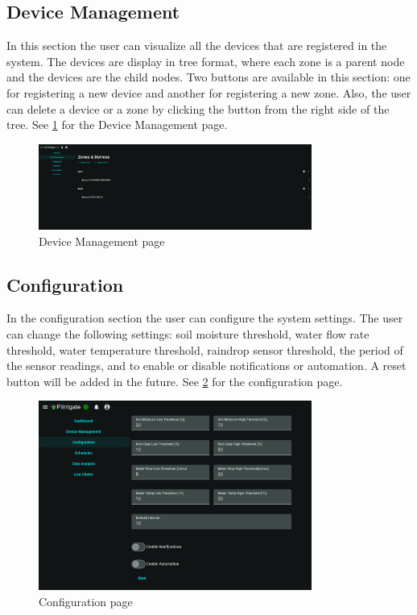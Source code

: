 \subsection{Device Management}
In this section the user can visualize all the devices that are registered in the system.
The devices are display in tree format, where each zone is a parent node and the devices are the child nodes.
Two buttons are available in this section: one for registering a new device and another for registering a new zone.
Also, the user can delete a device or a zone by clicking the button from the right side of the tree. See \ref{fig:device-management} 
for the Device Management page.
\begin{figure}[H]
    \centering
    \includegraphics[width=0.8\textwidth]{images/device_management.png}
    \caption{Device Management page}
    \label{fig:device-management}
\end{figure}

\subsection {Configuration}
In the configuration section the user can configure the system settings. The user can change the following settings:
soil moisture threshold, water flow rate threshold, water temperature threshold, raindrop sensor threshold, the 
period of the sensor readings, and to enable or disable notifications or automation. A reset button will be added in the future. See 
\ref{fig:configuration-page} for the configuration page.

\begin{figure}[H]
    \centering
    \includegraphics[width=0.8\textwidth]{images/configuration.png}
    \caption{Configuration page}
    \label{fig:configuration-page}
\end{figure}

